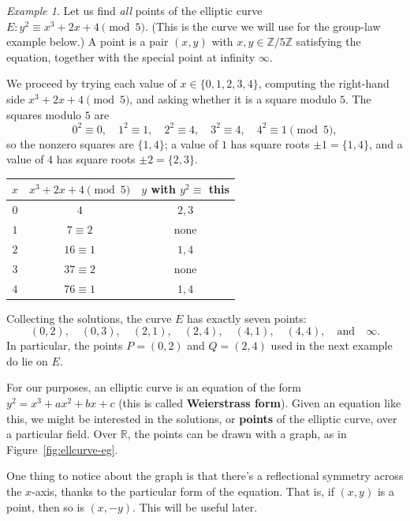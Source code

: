 \documentclass{article}
\theoremstyle{plain}
\theoremstyle{definition}
\theoremstyle{remark}
\newtheorem{example}[theorem]{Example}
\numberwithin{theorem}{section}
\newcommand{\RR}{\mathbb{R}}
\newcommand{\ZZ}{\mathbb{Z}}
\begin{document}
\begin{example}
Let us find \emph{all} points of the elliptic curve $E: y^2 \equiv x^3 + 2x + 4 \pmod{5}$.  (This is the curve we will use for the group-law example below.)  A point is a pair $(x,y)$ with $x, y \in \ZZ/5\ZZ$ satisfying the equation, together with the special point at infinity $\infty$.

We proceed by trying each value of $x \in \{0,1,2,3,4\}$, computing the right-hand side $x^3 + 2x + 4 \pmod 5$, and asking whether it is a square modulo $5$.  The squares modulo $5$ are
\[
0^2 \equiv 0, \quad 1^2 \equiv 1, \quad 2^2 \equiv 4, \quad 3^2 \equiv 4, \quad 4^2 \equiv 1 \pmod 5,
\]
so the nonzero squares are $\{1, 4\}$; a value of $1$ has square roots $\pm 1 = \{1, 4\}$, and a value of $4$ has square roots $\pm 2 = \{2, 3\}$.

\begin{center}
\begin{tabular}{c|c|c}
$x$ & $x^3 + 2x + 4 \pmod 5$ & $y$ with $y^2 \equiv$ this \\
\hline
$0$ & $4$ & $2, 3$ \\
$1$ & $7 \equiv 2$ & none \\
$2$ & $16 \equiv 1$ & $1, 4$ \\
$3$ & $37 \equiv 2$ & none \\
$4$ & $76 \equiv 1$ & $1, 4$ \\
\end{tabular}
\end{center}

Collecting the solutions, the curve $E$ has exactly seven points:
\[
(0,2), \quad (0,3), \quad (2,1), \quad (2,4), \quad (4,1), \quad (4,4), \quad \text{and} \quad \infty.
\]
In particular, the points $P = (0,2)$ and $Q = (2,4)$ used in the next example do lie on $E$.
\end{example}

For our purposes, an elliptic curve is an equation of the form $y^2 = x^3 + ax^2 + bx + c$ (this is called \textbf{Weierstrass form}).  Given an equation like this, we might be interested in the solutions, or \textbf{points} of the elliptic curve, over a particular field.  Over $\RR$, the points can be drawn with a graph, as in Figure~\ref{fig:ellcurve-eg}.

One thing to notice about the graph is that there's a reflectional symmetry across the $x$-axis, thanks to the particular form of the equation.  That is, if $(x,y)$ is a point, then so is $(x,-y)$.  This will be useful later.
\end{document}
